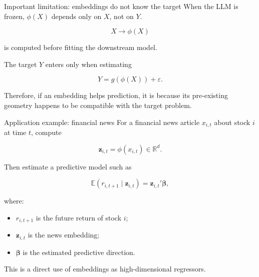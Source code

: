 \documentclass[aspectratio=169]{beamer}
\newcommand{\R}{\mathbb{R}}
\newcommand{\E}{\mathbb{E}}
\newcommand{\vect}[1]{\boldsymbol{#1}}
\begin{document}
\begin{frame}{Important limitation: embeddings do not know the target}
\large
When the LLM is frozen, \(\phi(X)\) depends only on \(X\), not on \(Y\).

\vspace{0.3cm}

\[
X \longrightarrow \phi(X)
\]

is computed before fitting the downstream model.

\vspace{0.25cm}

The target \(Y\) enters only when estimating

\[
Y = g(\phi(X))+\varepsilon.
\]

\vspace{0.3cm}

\begin{bluebox}
Therefore, if an embedding helps prediction, it is because its pre-existing geometry happens to be compatible with the target problem.
\end{bluebox}
\end{frame}

\begin{frame}{Application example: financial news}
\large
For a financial news article \(x_{i,t}\) about stock \(i\) at time \(t\), compute

\[
\vect{z}_{i,t}=\phi(x_{i,t}) \in \R^d.
\]

Then estimate a predictive model such as

\[
\E(r_{i,t+1}\mid \vect{z}_{i,t}) = \vect{z}_{i,t}'\vect{\beta},
\]

where:
\begin{itemize}
  \item \(r_{i,t+1}\) is the future return of stock \(i\);
  \item \(\vect{z}_{i,t}\) is the news embedding;
  \item \(\vect{\beta}\) is the estimated predictive direction.
\end{itemize}

\vspace{0.2cm}

This is a direct use of embeddings as high-dimensional regressors.
\end{frame}
\end{document}
